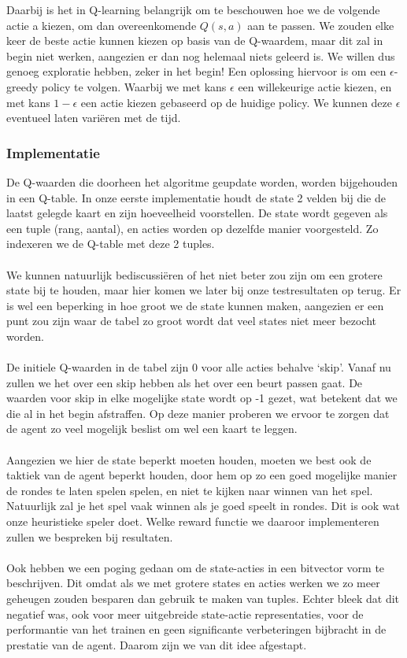 \documentclass[11pt]{article}
\begin{document}
Daarbij is het in Q-learning belangrijk om te beschouwen hoe we de volgende actie a kiezen, om dan overeenkomende $Q(s,a)$ aan te passen. We zouden elke keer de beste actie kunnen kiezen op basis van de Q-waardem, maar dit zal in begin niet werken, aangezien er dan nog helemaal niets geleerd is. We willen dus genoeg exploratie hebben, zeker in het begin! Een oplossing hiervoor is om een $\epsilon$-greedy policy te volgen. Waarbij we met kans $\epsilon$ een willekeurige actie kiezen, en met kans $1-\epsilon$ een actie kiezen gebaseerd op de huidige policy. We kunnen deze $\epsilon$ eventueel laten variëren met de tijd.\\

\subsubsection{Implementatie}
De Q-waarden die doorheen het algoritme geupdate worden, worden bijgehouden in een Q-table. In onze eerste implementatie houdt de state 2 velden bij die de laatst gelegde kaart en zijn hoeveelheid voorstellen. De state wordt gegeven als een tuple (rang, aantal), en acties worden op dezelfde manier voorgesteld. Zo indexeren we de Q-table met deze 2 tuples. \\\\
We kunnen natuurlijk bediscussiëren of het niet beter zou zijn om een grotere state bij te houden, maar hier komen we later bij onze testresultaten op terug. Er is wel een beperking in hoe groot we de state kunnen maken, aangezien er een punt zou zijn waar de tabel zo groot wordt dat veel states niet meer bezocht worden. \\\\
De initiele Q-waarden in de tabel zijn 0 voor alle acties behalve `skip'. Vanaf nu zullen we het over een skip hebben als het over een beurt passen gaat. De waarden voor skip in elke mogelijke state wordt op -1 gezet, wat betekent dat we die al in het begin afstraffen. Op deze manier proberen we ervoor te zorgen dat de agent zo veel mogelijk beslist om wel een kaart te leggen. \\\\
Aangezien we hier de state beperkt moeten houden, moeten we best ook de taktiek van de agent beperkt houden, door hem op zo een goed mogelijke manier de rondes te laten spelen spelen, en niet te kijken naar winnen van het spel. Natuurlijk zal je het spel vaak winnen als je goed speelt in rondes. Dit is ook wat onze heuristieke speler doet. Welke reward functie we daaroor implementeren zullen we bespreken bij resultaten.\\\\
Ook hebben we een poging gedaan om de state-acties in een bitvector vorm te beschrijven. Dit omdat als we met grotere states en acties werken we zo meer geheugen zouden besparen dan gebruik te maken van tuples. Echter bleek dat dit negatief was, ook voor meer uitgebreide state-actie representaties, voor de performantie van het trainen en geen significante verbeteringen bijbracht in de prestatie van de agent. Daarom zijn we van dit idee afgestapt.\\
\end{document}
